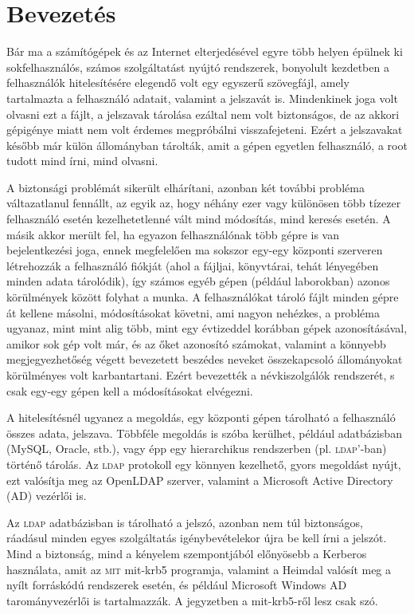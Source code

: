 \chapter{Bevezetés}

Bár ma a számítógépek és az Internet elterjedésével egyre több helyen épülnek ki sokfelhasználós, számos szolgáltatást
nyújtó rendszerek, bonyolult kezdetben a felhasználók hitelesítésére elegendő volt egy egyszerű szövegfájl, amely
tartalmazta a felhasználó adatait, valamint a jelszavát is. Mindenkinek joga volt olvasni ezt a fájlt, a jelszavak
tárolása ezáltal nem volt biztonságos, de az akkori gépigénye miatt nem volt érdemes megpróbálni visszafejeteni. Ezért a
jelszavakat később már külön állományban tárolták, amit a gépen egyetlen felhasználó, a root tudott mind írni, mind
olvasni.

A biztonsági problémát sikerült elhárítani, azonban két további probléma váltazatlanul fennállt, az egyik az, hogy
néhány ezer vagy különösen több tízezer felhasználó esetén kezelhetetlenné vált mind módosítás, mind keresés esetén. A
másik akkor merült fel, ha egyazon felhasználónak több gépre is van bejelentkezési joga, ennek megfelelően ma sokszor
egy-egy központi szerveren létrehozzák a felhasználó fiókját (ahol a fájljai, könyvtárai, tehát lényegében minden adata
tárolódik), így számos egyéb gépen (például laborokban) azonos körülmények között folyhat a munka. A felhasználókat
tároló fájlt minden gépre át kellene másolni, módosításokat követni, ami nagyon nehézkes, a probléma ugyanaz, mint  mint
alig több, mint egy évtizeddel korábban gépek azonosításával, amikor sok gép volt már, és az őket azonosító számokat,
valamint a könnyebb megjegyezhetőség végett bevezetett beszédes neveket összekapcsoló állományokat körülményes volt
karbantartani. Ezért bevezették a névkiszolgálók rendszerét, s csak egy-egy gépen kell a módosításokat elvégezni.

A hitelesítésnél ugyanez a megoldás, egy központi gépen tárolható a felhasználó összes adata, jelszava. Többféle
megoldás is szóba kerülhet, például adatbázisban (MySQL, Oracle, stb.), vagy épp egy hierarchikus rendszerben
(pl. \textsc{ldap}'-ban) történő tárolás. Az \textsc{ldap} protokoll egy könnyen kezelhető, gyors megoldást nyújt, ezt
valósítja meg az OpenLDAP szerver, valamint a Microsoft Active Directory (\textsc{AD}) vezérlői is. 

Az \textsc{ldap} adatbázisban is tárolható a jelszó, azonban nem túl biztonságos, ráadásul minden egyes szolgáltatás
igénybevételekor újra be kell írni a jelszót. Mind a biztonság, mind a kényelem szempontjából előnyösebb a Kerberos
használata, amit az \textsc{mit} mit-krb5 programja, valamint a Heimdal valósít meg a nyílt forráskódú rendszerek
esetén, és például Microsoft Windows AD tarományvezérlői is tartalmazzák. A jegyzetben a mit-krb5-ről lesz csak szó.

